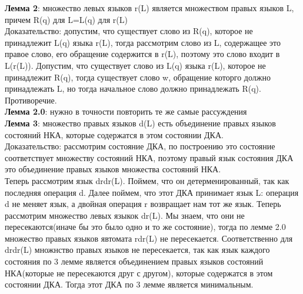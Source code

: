 \documentclass[a4paper,12pt]{article}
\begin{document}
\textbf{Лемма 2}: множество левых языков r(L) является множеством правых языков L, причем R(q) для L=L(q) для r(L)\\
Доказательство: допустим, что существует слово из R(q), которое не принадлежит L(q) языка r(L), тогда рассмотрим слово из L, содержащее это правое слово, его обращение содержится в r(L), поэтому это слово входит в L(r(L)). Допустим, что существует слово из L(q) языка r(L), которое не принадлежит R(q), тогда существует слово w, обращение которго должно принадлежать L, но тогда начальное слово должно принадлежать R(q). Противоречие.\\


\textbf{Лемма 2.0}: нужно в точности повторить те же самые рассуждения\\

\textbf{Лемма 3}: множество правых языков d(L) есть объединение правых языков состояний НКА, которые содержатся в этом состоянии ДКА.\\
Доказательство: рассмотрим состояние ДКА, по построению это состояние соответствует множеству состояний НКА, поэтому правый язык состояния ДКА это объединение правых языков множества состояний НКА.\\

Теперь рассмотрим язык drdr(L). Поймем, что он детерменированный, так как последняя операция d. Далее поймем, что этот ДКА принимает язык L: операция d не меняет язык, а двойная операция r возвращает нам тот же язык. Теперь рассмотрим множество левых языкок dr(L). Мы знаем, что они не пересекаются(иначе бы это было одно и то же состояние), тогда по лемме 2.0 множество правых языков явтомата rdr(L) не пересекается. Соответственно для drdr(L) множнство правых языков не пересекается, так как язык каждого состояния по 3 лемме является объединением правых языков состояний НКА(которые не пересекаются друг с другом), которые содержатся в этом состоянии ДКА. Тогда этот ДКА по 3 лемме является минимальным.\\
\end{document}
